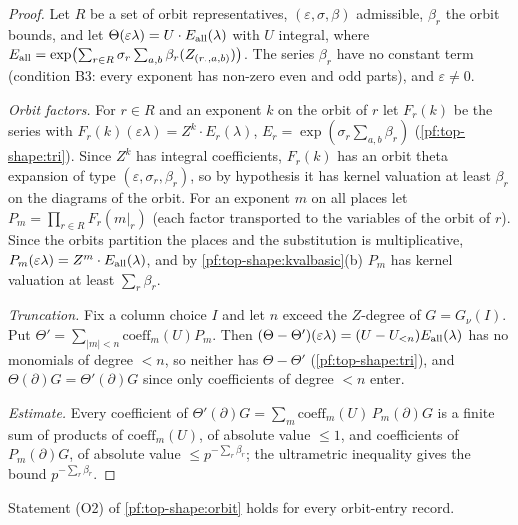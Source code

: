 \begin{proof}
Let $R$ be a set of orbit representatives, $(\varepsilon,\sigma,\beta)$ admissible, $\beta_r$ the orbit bounds, and let
$\Theta(\varepsilon\lambda)=U\cdot E_{\rm all}(\lambda)$ with $U$ integral, where $E_{\rm all}=\exp\bigl(\sum_{r\in R}\sigma_r\sum_{a,b}
\beta_r(Z_{(r_\cdot,a,b)})\bigr)$. The series $\beta_r$ have no constant term (condition B3: every exponent has non-zero
even and odd parts), and $\varepsilon\ne0$.

\emph{Orbit factors.} For $r\in R$ and an exponent $k$ on the orbit of $r$ let $F_r(k)$ be the series with
$F_r(k)(\varepsilon\lambda)=Z^k\cdot E_r(\lambda)$, $E_r=\exp(\sigma_r\sum_{a,b}\beta_r)$ (\cref{pf:top-shape:tri}). Since $Z^k$ has
integral coefficients, $F_r(k)$ has an orbit theta expansion of type $(\varepsilon,\sigma_r,\beta_r)$, so by hypothesis it has
kernel valuation at least $\beta_r$ on the diagrams of the orbit. For an exponent $m$ on all places let
$P_m=\prod_{r\in R}F_r(m|_r)$ (each factor transported to the variables of the orbit of $r$). Since the orbits partition
the places and the substitution is multiplicative, $P_m(\varepsilon\lambda)=Z^m\cdot E_{\rm all}(\lambda)$, and
by \cref{pf:top-shape:kvalbasic}(b) $P_m$ has kernel valuation at least $\sum_r\beta_r$.

\emph{Truncation.} Fix a column choice $I$ and let $n$ exceed the $Z$-degree of $G=G_\nu(I)$. Put
$\Theta'=\sum_{|m|<n}\mathrm{coeff}_m(U)P_m$. Then $(\Theta-\Theta')(\varepsilon\lambda)=(U-U_{<n})E_{\rm all}(\lambda)$ has no
monomials of degree $<n$, so neither has $\Theta-\Theta'$ (\cref{pf:top-shape:tri}), and $\Theta(\partial)G=\Theta'(\partial)G$
since only coefficients of degree $<n$ enter.

\emph{Estimate.} Every coefficient of $\Theta'(\partial)G=\sum_m\mathrm{coeff}_m(U)\,P_m(\partial)G$ is a finite sum of
products of $\mathrm{coeff}_m(U)$, of absolute value $\le1$, and coefficients of $P_m(\partial)G$, of absolute value
$\le p^{-\sum_r\beta_r}$; the ultrametric inequality gives the bound $p^{-\sum_r\beta_r}$.
\end{proof}

\begin{proposition}\label{pf:top-shape:o2}
Statement (O2) of \cref{pf:top-shape:orbit} holds for every orbit-entry record.
\end{proposition}

